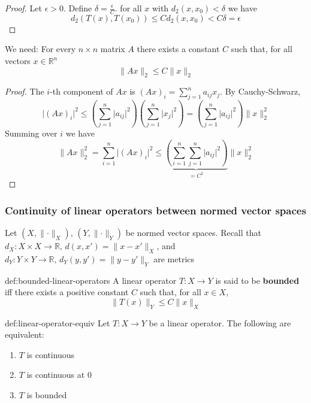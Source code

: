 \documentclass[landscape, 8pt]{extarticle}
\begin{document}
\begin{multicols}{3}
\begin{proof}
    Let $\epsilon > 0$. Define $\delta = \frac{\epsilon}{C}$. for all $x$ with $d_{2}(x,x_{0}) < \delta$ we have
    \[d_{2}(T(x), T(x_{0})) \le Cd_{2}(x,x_{0}) < C\delta = \epsilon\]


\end{proof}

We need: For every $n \times n$ matrix $A$ there exists a constant $C$ such that, for all vectors $x\in \mathbb{R}^{n}$
\[\lVert Ax \rVert_{2} \le C\lVert x \rVert_{2}\]

\begin{proof}
    The $i$-th component of $Ax$ is $(Ax)_{i} = \sum_{j = 1}^{n} a_{ij}x_{j}$. By Cauchy-Schwarz,
    \[\lvert (Ax)_{i} \rvert^{2} \le \left(\sum_{j = 1}^{n} \lvert a_{ij} \rvert^{2}\right) \left(\sum_{j = 1}^{n} \lvert x_{j} \rvert^{2}\right) = \left(\sum_{j = 1}^{n} \lvert a_{ij} \rvert^{2}\right) \lVert  x \rVert^{2}_{2}\]
    Summing over $i$ we have
    \[\lVert Ax \rVert^{2}_{2} = \sum_{i = 1}^{n}\lvert (Ax)_{i} \rvert^{2} \le \underbrace{\left(\sum_{i = 1}^{n}\sum_{j = 1}^{n} \lvert a_{ij} \rvert^{2}\right)}_{= C^{2}} \lVert x \rVert^{2}_{2}\]
\end{proof}

\subsubsection{Continuity of linear operators between normed vector spaces}
Let $(X, \lVert \cdot \rVert_{X}),\,(Y, \lVert \cdot \rVert_{Y})$ be normed vector spaces. Recall that $d_{X} : X \times X \to \mathbb{R},\,d(x, x') = \lVert x - x' \rVert_{X}$, and $d_{Y} : Y \times Y \to \mathbb{R},\, d_{Y}(y, y') = \lVert  y - y' \rVert_{Y}$ are metrics

\begin{dfn}{def:bounded-linear-operators}{}
    A linear operator $T : X \to Y$ is said to be \textbf{bounded} iff there exists a positive constant $C$ such that, for all $x\in X$,
    \[\lVert T(x) \rVert_{Y} \le C \lVert x \rVert_{X}\]
\end{dfn}

\begin{thm}{def:linear-operator-equiv}{}
    Let $T: X \to Y $ be a linear operator. The following are equivalent:
    \begin{enumerate}
        \item $T$ is continuous
        \item $T$ is continuous at $0$
        \item $T$ is bounded
    \end{enumerate}
\end{thm}


\end{multicols}
\end{document}

